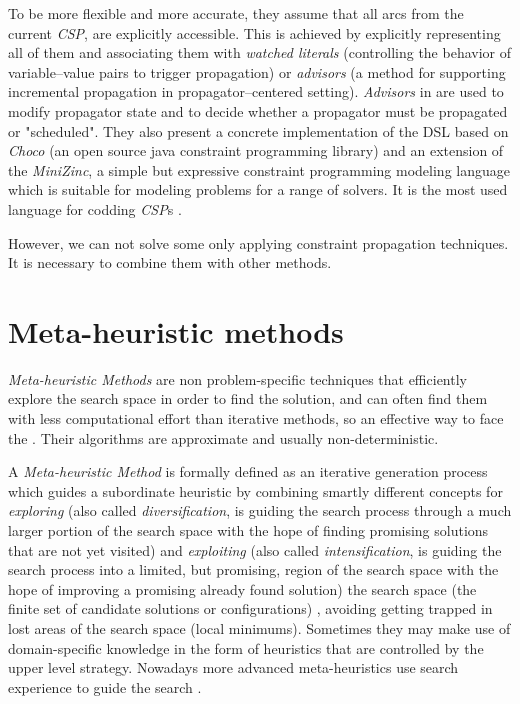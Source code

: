 To be more flexible and more accurate, they assume that all arcs from the current \textit{CSP}, are explicitly accessible. This is achieved by explicitly representing all of them and associating them with {\it watched literals} \cite{Gent2006} (controlling the behavior of variable--value pairs to trigger propagation) or {\it advisors} \cite{Lagerkvist2007} (a method for supporting incremental propagation in propagator--centered setting). {\it Advisors} in \cite{Lagerkvist2007} are used to modify propagator state and to decide whether a propagator must be propagated or "scheduled". They also present a concrete implementation of the DSL based on {\it Choco} \cite{Jussien2008} (an open source java constraint programming library) and an extension of the \textit{MiniZinc}, a simple but expressive constraint programming modeling language which is suitable for modeling problems for a range of solvers. It is the most used language for codding \textit{CSP}s \cite{Nethercote}.

However, we can not solve some \csps{} only applying constraint propagation techniques. It is necessary to combine them with other methods. 

\section{Meta-heuristic methods}
\label{sec:meta}

{\it Meta-heuristic Methods} are non problem-specific techniques that efficiently explore the search space in order to find the solution, and can often find them with less computational effort than iterative methods, so an effective way to face the \csps. Their algorithms are approximate and usually non-deterministic.

A {\it Meta-heuristic Method} is formally defined as an iterative generation process which guides a subordinate heuristic by combining smartly different concepts for \textit{exploring} (also called \textit{diversification}, is guiding the search process through a much larger portion of the search space with the hope of finding promising solutions that are not yet visited) and \textit{exploiting} (also called \textit{intensification}, is guiding the search process into a limited, but promising, region of the search space with the hope of improving a promising already found solution) the search space (the finite set of candidate solutions or configurations) \cite{Osman1996}, avoiding getting trapped in lost areas of the search space (local minimums). Sometimes they may make use of domain-specific knowledge in the form of heuristics that are controlled by the upper level strategy. Nowadays more advanced meta-heuristics use search experience to guide the search \cite{Blum2003}.

